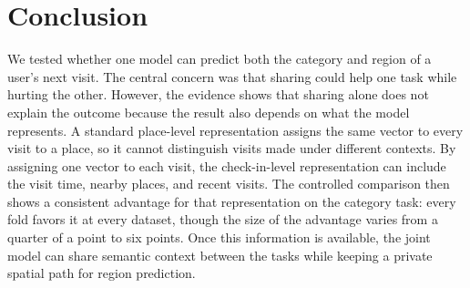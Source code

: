 \section{Conclusion}
\label{sec:mobiwac:conclusion}

We tested whether one model can predict both the category and region of a user's next visit. The central concern was
that sharing could help one task while hurting the other. However, the evidence shows that sharing alone does not
explain the outcome because the result also depends on what the model represents. A standard place-level representation
assigns the same vector to every visit to a place, so it cannot distinguish visits made under different contexts. By
assigning one vector to each visit, the check-in-level representation can include the visit time, nearby places, and
recent visits. The controlled comparison then shows a consistent advantage for that representation on the category
task: every fold favors it at every dataset, though the size of the advantage varies from a quarter of a point to
six points. Once this information is available, the joint model can share
semantic context between the tasks while keeping a private spatial path for region prediction.

